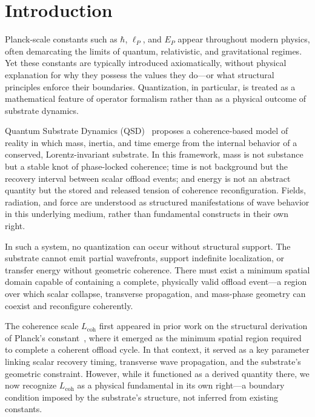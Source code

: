 \documentclass[entropy,article,submit,pdftex,moreauthors]{Definitions/mdpi}
\begin{document}

\section{Introduction}

Planck-scale constants such as \texorpdfstring{\( \hbar \)}{hbar}, \texorpdfstring{\( \ell_P \)}{lP}, and \texorpdfstring{\( E_P \)}{EP} appear throughout modern physics, often demarcating the limits of quantum, relativistic, and gravitational regimes. Yet these constants are typically introduced axiomatically, without physical explanation for why they possess the values they do---or what structural principles enforce their boundaries. Quantization, in particular, is treated as a mathematical feature of operator formalism rather than as a physical outcome of substrate dynamics.

Quantum Substrate Dynamics (QSD)~\cite{bush2025} proposes a coherence-based model of reality in which mass, inertia, and time emerge from the internal behavior of a conserved, Lorentz-invariant substrate. In this framework, mass is not substance but a stable knot of phase-locked coherence; time is not background but the recovery interval between scalar offload events; and energy is not an abstract quantity but the stored and released tension of coherence reconfiguration. Fields, radiation, and force are understood as structured manifestations of wave behavior in this underlying medium, rather than fundamental constructs in their own right.

In such a system, no quantization can occur without structural support. The substrate cannot emit partial wavefronts, support indefinite localization, or transfer energy without geometric coherence. There must exist a minimum spatial domain capable of containing a complete, physically valid offload event---a region over which scalar collapse, transverse propagation, and mass-phase geometry can coexist and reconfigure coherently.

The coherence scale \texorpdfstring{\( L_{\text{coh}} \)}{Lcoh} first appeared in prior work on the structural derivation of Planck’s constant~\cite{bush-planck-2025}, where it emerged as the minimum spatial region required to complete a coherent offload cycle. In that context, it served as a key parameter linking scalar recovery timing, transverse wave propagation, and the substrate’s geometric constraint. However, while it functioned as a derived quantity there, we now recognize \texorpdfstring{\( L_{\text{coh}} \)}{Lcoh} as a physical fundamental in its own right---a boundary condition imposed by the substrate’s structure, not inferred from existing constants.
\end{document}

